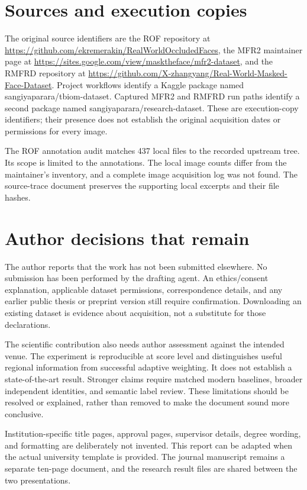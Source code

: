 \documentclass[12pt,a4paper,oneside]{report}
\begin{document}
\section{Sources and execution copies}
The original source identifiers are the ROF repository at \url{https://github.com/ekremerakin/RealWorldOccludedFaces}, the MFR2 maintainer page at \url{https://sites.google.com/view/masktheface/mfr2-dataset}, and the RMFRD repository at \url{https://github.com/X-zhangyang/Real-World-Masked-Face-Dataset}. Project workflows identify a Kaggle package named sangiyaparara/tbiom-dataset. Captured MFR2 and RMFRD run paths identify a second package named sangiyaparara/research-dataset. These are execution-copy identifiers; their presence does not establish the original acquisition dates or permissions for every image.

The ROF annotation audit matches 437 local files to the recorded upstream tree. Its scope is limited to the annotations. The local image counts differ from the maintainer's inventory, and a complete image acquisition log was not found. The source-trace document preserves the supporting local excerpts and their file hashes.

\section{Author decisions that remain}
The author reports that the work has not been submitted elsewhere. No submission has been performed by the drafting agent. An ethics/consent explanation, applicable dataset permissions, correspondence details, and any earlier public thesis or preprint version still require confirmation. Downloading an existing dataset is evidence about acquisition, not a substitute for those declarations.

The scientific contribution also needs author assessment against the intended venue. The experiment is reproducible at score level and distinguishes useful regional information from successful adaptive weighting. It does not establish a state-of-the-art result. Stronger claims require matched modern baselines, broader independent identities, and semantic label review. These limitations should be resolved or explained, rather than removed to make the document sound more conclusive.

Institution-specific title pages, approval pages, supervisor details, degree wording, and formatting are deliberately not invented. This report can be adapted when the actual university template is provided. The journal manuscript remains a separate ten-page document, and the research result files are shared between the two presentations.
\end{document}
